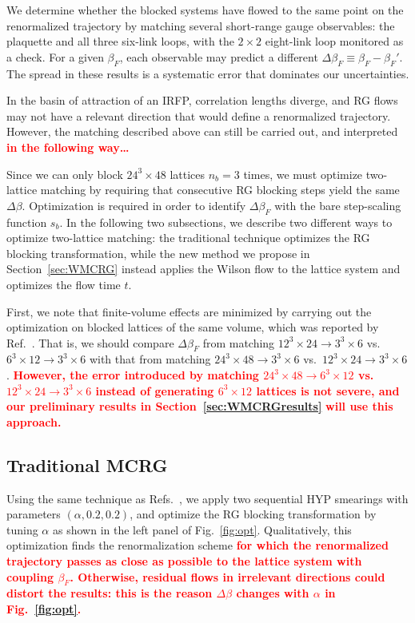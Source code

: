 \documentclass{PoS}
\newcommand{\al}{\ensuremath{\alpha} }
\newcommand{\be}{\ensuremath{\beta} }
\newcommand{\De}{\ensuremath{\Delta} }
\newcommand{\X}{\ensuremath{\!\times\!} }
\newcommand{\refcite}[1]{Ref.~\cite{#1}}
\newcommand{\fig}[1]{Fig.~\ref{#1}}
\newcommand{\secref}[1]{Section~\ref{#1}}
\newcommand{\TODO}[1]{\textcolor{red}{{\bf #1}}}
\begin{document}
We determine whether the blocked systems have flowed to the same point on the renormalized trajectory by matching several short-range gauge observables: the plaquette and all three six-link loops, with the $2\X2$ eight-link loop monitored as a check.
For a given $\be_F$, each observable may predict a different $\De\be_F \equiv \be_F - \be_F'$.
The spread in these results is a systematic error that dominates our uncertainties.

In the basin of attraction of an IRFP, correlation lengths diverge, and RG flows may not have a relevant direction that would define a renormalized trajectory.
However, the matching described above can still be carried out, and interpreted \TODO{in the following way\dots}

Since we can only block $24^3\X48$ lattices $n_b = 3$ times, we must optimize two-lattice matching by requiring that consecutive RG blocking steps yield the same $\De\be$.
Optimization is required in order to identify $\De\be_F$ with the bare step-scaling function $s_b$.
In the following two subsections, we describe two different ways to optimize two-lattice matching: the traditional technique optimizes the RG blocking transformation, while the new method we propose in \secref{sec:WMCRG} instead applies the Wilson flow to the lattice system and optimizes the flow time $t$.

First, we note that finite-volume effects are minimized by carrying out the optimization on blocked lattices of the same volume, which was reported by \refcite{Hasenfratz:2011xn}.
That is, we should compare $\De\be_F$ from matching $12^3\X24 \to 3^3\X6$ vs.\ $6^3\X12 \to 3^3\X6$ with that from matching $24^3\X48 \to 3^3\X6$ vs.\ $12^3\X24 \to 3^3\X6$.
\TODO{However, the error introduced by matching $24^3\X48 \to 6^3\X12$ vs.\ $12^3\X24 \to 3^3\X6$ instead of generating $6^3\X12$ lattices is not severe, and our preliminary results in \secref{sec:WMCRGresults}} \TODO{will use this approach.}



\subsection{Traditional MCRG} %
Using the same technique as Refs.~\cite{Hasenfratz:2011xn, Hasenfratz:2011np}, we apply two sequential HYP smearings with parameters $(\al, 0.2, 0.2)$, and optimize the RG blocking transformation by tuning \al as shown in the left panel of \fig{fig:opt}.
Qualitatively, this optimization finds the renormalization scheme \TODO{for which the renormalized trajectory passes as close as possible to the lattice system with coupling $\be_F$.
Otherwise, residual flows in irrelevant directions could distort the results: this is the reason $\De\be$ changes with \al in \fig{fig:opt}.}
\end{document}
